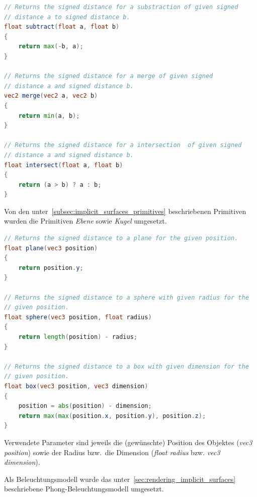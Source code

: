 \begin{lstlisting}[language=GLSL,caption={Umsetzung der Operationen
        \textit{Vereinigung}, \textit{Subtraktion} sowie
        \textit{Intersektion} für implizite Oberflächen in
        GLSL.},label={alg:glsl_ops},captionpos=b,emph={subtract,merge,intersect}]
// Returns the signed distance for a substraction of given signed
// distance a to signed distance b.
float subtract(float a, float b)
{
    return max(-b, a);
}

// Returns the signed distance for a merge of given signed
// distance a and signed distance b.
vec2 merge(vec2 a, vec2 b)
{
    return min(a, b);
}

// Returns the signed distance for a intersection  of given signed
// distance a and signed distance b.
float intersect(float a, float b)
{
    return (a > b) ? a : b;
}
\end{lstlisting}

Von den unter~\autoref{subsec:implicit_surfaces_primitives} beschriebenen
Primitiven wurden die Primitiven \textit{Ebene} sowie \textit{Kugel} umgesetzt.

\begin{lstlisting}[language=GLSL,caption={Umsetzung der Primitiven
        \textit{Ebene} und \textit{Kugel} in Form von impliziten
        Oberflächen in
        GLSL.},label={alg:glsl_primitives},captionpos=b,emph={plane,sphere,box}]
// Returns the signed distance to a plane for the given position.
float plane(vec3 position)
{
    return position.y;
}

// Returns the signed distance to a sphere with given radius for the
// given position.
float sphere(vec3 position, float radius)
{
    return length(position) - radius;
}

// Returns the signed distance to a box with given dimension for the
// given position.
float box(vec3 position, vec3 dimension)
{
    position = abs(position) - dimension;
    return max(max(position.x, position.y), position.z);
}
\end{lstlisting}

Verwendete Parameter sind jeweils die (gewünschte) Position des Objektes
(\textit{vec3 position}) sowie der Radius bzw.\ die Dimension
(\textit{float radius} bzw. \textit{vec3 dimension}).

Als Beleuchtungsmodell wurde das
unter~\autoref{sec:rendering_implicit_surfaces} beschriebene
Phong-Beleuchtungsmodell umgesetzt.


